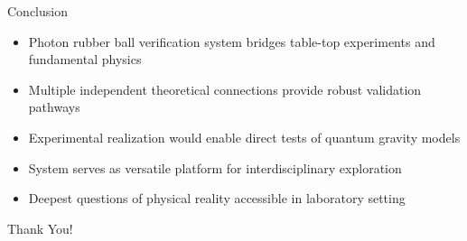 \documentclass{beamer}
\begin{document}
\begin{frame}{Conclusion}
\begin{itemize}
\item Photon rubber ball verification system bridges table-top experiments and fundamental physics
\item Multiple independent theoretical connections provide robust validation pathways
\item Experimental realization would enable direct tests of quantum gravity models
\item System serves as versatile platform for interdisciplinary exploration
\item Deepest questions of physical reality accessible in laboratory setting
\end{itemize}

\vspace{0.5cm}
\begin{center}
\Large{Thank You!}
\end{center}
\end{frame}
\end{document}
